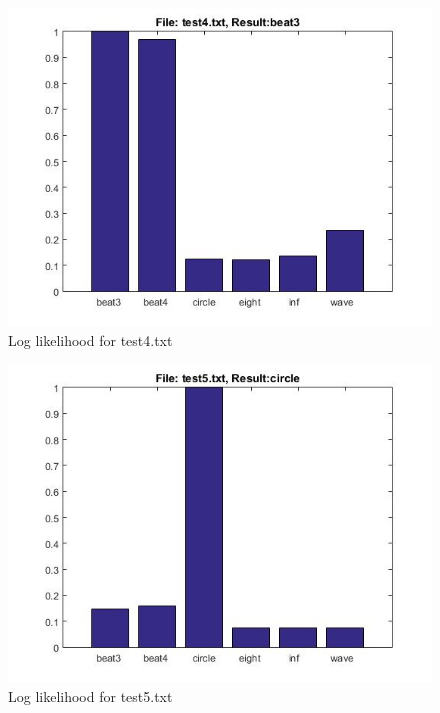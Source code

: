 \documentclass[fleqn,10pt]{SelfArx} %
\begin{document}
\begin{figure}[hbtp]
\centering
\includegraphics[scale=0.45]{test4.jpg}
\caption{Log likelihood for test4.txt}
\label{fig:test4}
\end{figure}

\begin{figure}[hbtp]
\centering
\includegraphics[scale=0.45]{test5.jpg}
\caption{Log likelihood for test5.txt}
\label{fig:test5}
\end{figure}
\end{document}
